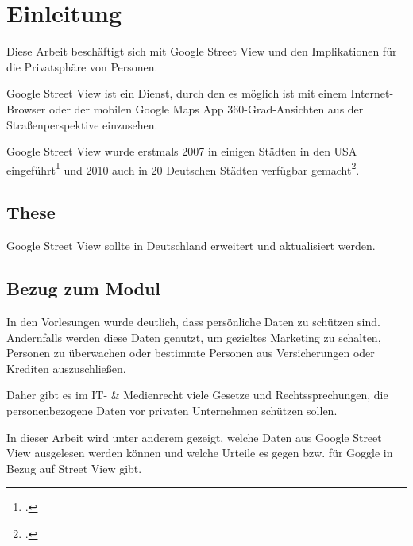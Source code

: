 \newpage

\section{Einleitung} \label{Einleitung}
Diese Arbeit beschäftigt sich mit Google Street View und den Implikationen für
die Privatsphäre von Personen.

Google Street View ist ein Dienst, durch den es möglich ist mit einem
Internet-Browser oder der mobilen Google Maps App 360-Grad-Ansichten aus der
Straßenperspektive einzusehen.

Google Street View wurde erstmals 2007 in einigen Städten in den USA
eingeführt\footcite{website:heise:google-street-view-einfuehrung-usa} und 2010 auch
in 20 Deutschen Städten verfügbar gemacht\footcite{website:sueddeutsche:20-deutsche-stadte-online}.

\subsection{These}

Google Street View sollte in Deutschland erweitert und aktualisiert werden.

\subsection{Bezug zum Modul}

In den Vorlesungen wurde deutlich, dass persönliche Daten zu schützen sind.
Andernfalls werden diese Daten genutzt, um gezieltes Marketing zu schalten,
Personen zu überwachen oder bestimmte Personen aus Versicherungen oder Krediten
auszuschließen.

Daher gibt es im IT- \& Medienrecht viele Gesetze und Rechtssprechungen, die
personenbezogene Daten vor privaten Unternehmen schützen sollen.

In dieser Arbeit wird unter anderem gezeigt, welche Daten aus Google Street View
ausgelesen werden können und welche Urteile es gegen bzw. für Goggle in Bezug
auf Street View gibt.
